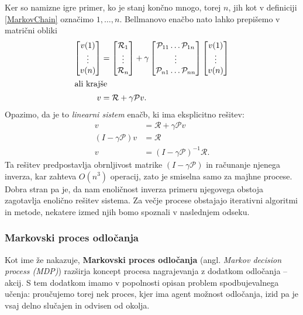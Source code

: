 \documentclass[12pt,a4paper]{amsart}
\theoremstyle{definition} %
\theoremstyle{plain} %
\begin{document}
Ker so namizne igre primer, ko je stanj končno mnogo, torej $n$, jih kot v definiciji \ref{MarkovChain}
označimo $1, \dots, n$. Bellmanovo enačbo nato lahko prepišemo v matrični obliki
\begin{align*}
    \begin{bmatrix}
        v(1) \\ 
        \vdots \\ 
        v(n)
    \end{bmatrix}
    &=
    \begin{bmatrix}
        \mathcal{R}_1 \\ 
        \vdots \\ 
        \mathcal{R}_n 
    \end{bmatrix}
    + \gamma
    \begin{bmatrix}
        \mathcal{P}_{11} \dots \mathcal{P}_{1n} \\ 
        \vdots \\ 
        \mathcal{P}_{n1} \dots \mathcal{P}_{nn}
    \end{bmatrix}
    \begin{bmatrix}
        v(1) \\ 
        \vdots \\ 
        v(n)
    \end{bmatrix} \\
    \intertext{ali krajše}
    v &= \mathcal{R} + \gamma \mathcal{P}v.
\end{align*}
Opazimo, da je to \textit{linearni sistem} enačb, ki ima eksplicitno rešitev: 
\begin{align*}
    v &= \mathcal{R} + \gamma \mathcal{P}v \\
    (I - \gamma \mathcal{P}) v &= \mathcal{R} \\
    v &= (I - \gamma \mathcal{P})^{-1} \mathcal{R}.
\end{align*}
Ta rešitev predpostavlja obrnljivost matrike $(I - \gamma \mathcal{P})$ in računanje njenega 
inverza, kar zahteva $O(n^3)$ operacij, zato je smiselna samo za majhne procese. Dobra stran pa je, 
da nam enoličnost inverza primeru njegovega obstoja zagotavlja enolično rešitev sistema. Za večje procese
obstajajo iterativni algoritmi in metode, nekatere izmed njih bomo spoznali v naslednjem odseku.

\subsubsection{Markovski proces odločanja}
Kot ime že nakazuje, \textbf{Markovski proces odločanja} (angl. \textit{Markov decision process (MDP)}) 
razširja koncept procesa nagrajevanja z dodatkom odločanja -- akcij. S tem dodatkom imamo v popolnosti 
opisan problem spodbujevalnega učenja: proučujemo torej nek proces, kjer ima agent možnost odločanja, 
izid pa je vsaj delno slučajen in odvisen od okolja. 
\end{document}
